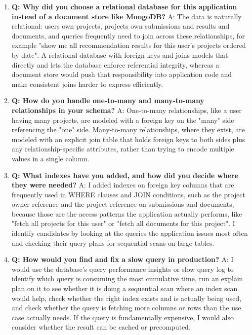 \documentclass[11pt,a4paper]{report}
\begin{document}
\begin{enumerate}[leftmargin=*]
\item \textbf{Q: Why did you choose a relational database for this application instead of a document store like MongoDB?}
A: The data is naturally relational: users own projects, projects own submissions and results and documents, and queries frequently need to join across these relationships, for example "show me all recommendation results for this user's projects ordered by date". A relational database with foreign keys and joins models that directly and lets the database enforce referential integrity, whereas a document store would push that responsibility into application code and make consistent joins harder to express efficiently.

\item \textbf{Q: How do you handle one-to-many and many-to-many relationships in your schema?}
A: One-to-many relationships, like a user having many projects, are modeled with a foreign key on the "many" side referencing the "one" side. Many-to-many relationships, where they exist, are modeled with an explicit join table that holds foreign keys to both sides plus any relationship-specific attributes, rather than trying to encode multiple values in a single column.

\item \textbf{Q: What indexes have you added, and how did you decide where they were needed?}
A: I added indexes on foreign key columns that are frequently used in WHERE clauses and JOIN conditions, such as the project owner reference and the project reference on submissions and documents, because those are the access patterns the application actually performs, like "fetch all projects for this user" or "fetch all documents for this project". I identify candidates by looking at the queries the application issues most often and checking their query plans for sequential scans on large tables.

\item \textbf{Q: How would you find and fix a slow query in production?}
A: I would use the database's query performance insights or slow query log to identify which query is consuming the most cumulative time, run an explain plan on it to see whether it is doing a sequential scan where an index scan would help, check whether the right index exists and is actually being used, and check whether the query is fetching more columns or rows than the use case actually needs. If the query is fundamentally expensive, I would also consider whether the result can be cached or precomputed.


\end{enumerate}
\end{document}
